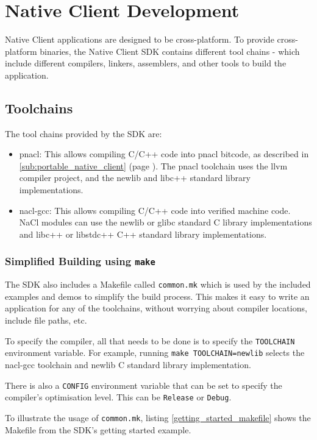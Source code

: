 \section{Native Client Development} %
\label{sec:native_client_development}
Native Client applications are designed to be cross-platform. To provide cross-platform binaries, the Native Client SDK contains different tool chains - which include different compilers, linkers, assemblers, and other tools to build the application.

\subsection{Toolchains} %
\label{sub:toolchains}
The tool chains provided by the SDK are:
\begin{itemize}
	\item pnacl: This allows compiling C/C++ code into pnacl bitcode, as described in \ref{sub:portable_native_client} (page \pageref{sub:portable_native_client}). The pnacl toolchain uses the llvm compiler project, and the newlib and libc++ standard library implementations.
	\item nacl-gcc: This allows compiling C/C++ code into verified machine code. NaCl modules can use the newlib or glibc standard C library implementations and libc++ or libstdc++ C++ standard library implementations.
\end{itemize}

\subsubsection{Simplified Building using \lstinline+make+} %
\label{ssub:building}
The SDK also includes a Makefile called \lstinline+common.mk+ which is used by the included examples and demos to simplify the build process. This makes it easy to write an application for any of the toolchains, without worrying about compiler locations, include file paths, etc.

To specify the compiler, all that needs to be done is to specify the \lstinline+TOOLCHAIN+ environment variable. For example, running \lstinline+make TOOLCHAIN=newlib+ selects the nacl-gcc toolchain and newlib C standard library implementation.

There is also a \lstinline+CONFIG+ environment variable that can be set to specify the compiler's optimisation level. This can be \lstinline+Release+ or \lstinline+Debug+.

To illustrate the usage of \lstinline+common.mk+, listing \ref{getting_started_makefile} shows the Makefile from the SDK's getting started example.

